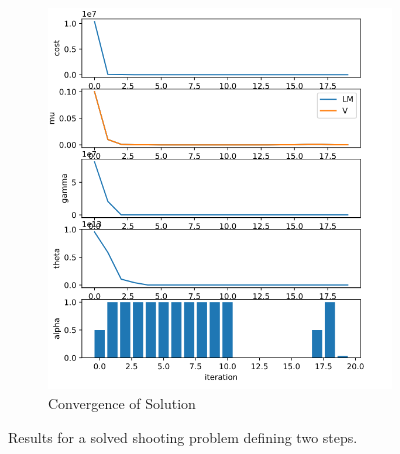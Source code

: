 \begin{figure}[h!]
\begin{subfigure}{.4\textwidth}
  \includegraphics[width=1\linewidth]{Media/Crocoddyl/RH5/2Steps/RH52Steps_Convergence.png}
  \caption{Convergence of Solution}
\end{subfigure}
\caption{Results for a solved shooting problem defining two steps.}
\label{fig:rh5_two_steps}
\centering
\end{figure}

